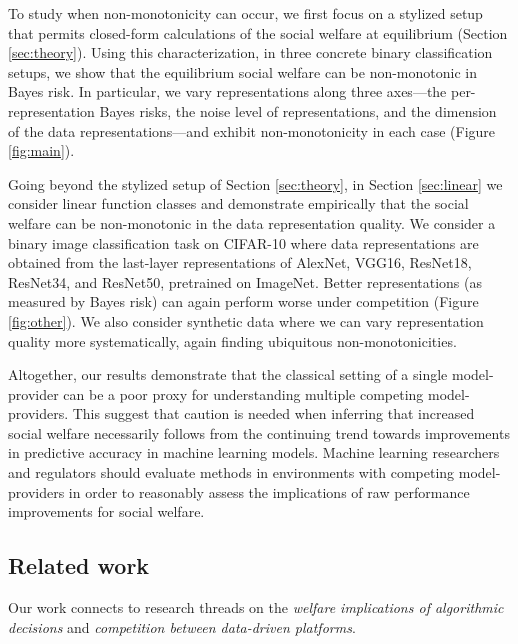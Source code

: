 \documentclass[letterpaper,11pt]{article}
\theoremstyle{plain}
\begin{document}
To study when non-monotonicity can occur, we first focus on a stylized setup that permits closed-form calculations of the social welfare at equilibrium (Section \ref{sec:theory}). Using this characterization, in three concrete binary classification setups, we show that the equilibrium social welfare can be non-monotonic in Bayes risk. In particular, we vary representations along three axes---the per-representation Bayes risks, the noise level of representations, and the dimension of the data representations---and exhibit non-monotonicity in each case (Figure \ref{fig:main}).

Going beyond the stylized setup of Section \ref{sec:theory}, in Section \ref{sec:linear} we consider linear function classes and   demonstrate empirically that the social welfare can be non-monotonic in the data representation quality. We consider a binary image classification task on CIFAR-10 where data representations are obtained from the last-layer representations of AlexNet, VGG16, ResNet18, ResNet34, and ResNet50,  pretrained on ImageNet. Better representations (as measured by Bayes risk) can again perform worse under competition (Figure \ref{fig:other}). We  also consider synthetic data where we can vary representation quality more systematically, again finding ubiquitous non-monotonicities.


Altogether, our results demonstrate that the classical setting of a single model-provider can be a poor proxy for understanding multiple competing model-providers.  This suggest that caution is needed when inferring that increased social welfare necessarily follows from  the continuing trend towards improvements in predictive accuracy in machine learning models. Machine learning researchers and regulators should evaluate methods in environments with competing model-providers in order to reasonably assess the implications of raw performance improvements for social welfare. 

 

\subsection{Related work}

Our work connects to research threads on the \textit{welfare implications of algorithmic decisions} and \textit{competition between data-driven platforms}. 
\end{document}
